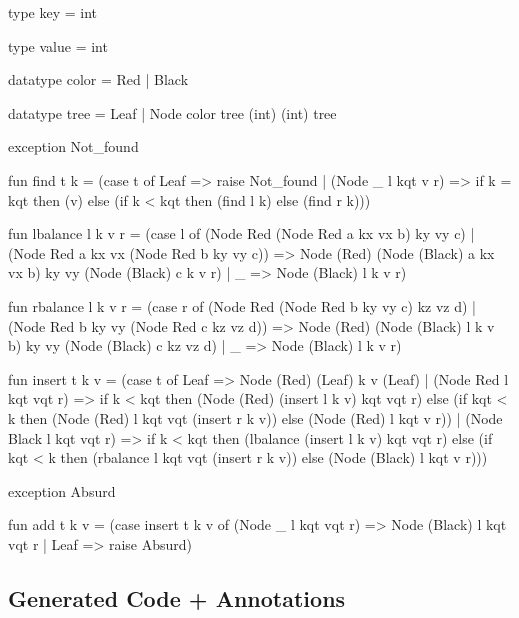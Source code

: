\begin{cakeml}
type key = int

type value = int

datatype color = Red | Black

datatype tree = Leaf | Node color tree (int) (int) tree

exception Not_found



fun find t k =
  (case t of
    Leaf => raise Not_found
  | (Node _ l kqt v r) =>
    if k = kqt then (v)  else (if k < kqt then (find l k)  else (find r k)))

fun lbalance l k v r =
  (case l of
    (Node Red (Node Red a kx vx b) ky vy c) | (Node Red a kx vx (Node Red b
    ky vy c)) =>
    Node (Red) (Node (Black) a kx vx b) ky vy (Node (Black) c k v r)
  | _ => Node (Black) l k v r)

fun rbalance l k v r =
  (case r of
    (Node Red (Node Red b ky vy c) kz vz d) | (Node Red b ky vy (Node Red c
    kz vz d)) =>
    Node (Red) (Node (Black) l k v b) ky vy (Node (Black) c kz vz d)
  | _ => Node (Black) l k v r)

fun insert t k v =
  (case t of
    Leaf => Node (Red) (Leaf) k v (Leaf)
  | (Node Red l kqt vqt r) =>
    if k < kqt then (Node (Red) (insert l k v) kqt vqt r) 
    else (if kqt < k then (Node (Red) l kqt vqt (insert r k v)) 
          else (Node (Red) l kqt v r))
  | (Node Black l kqt vqt r) =>
    if k < kqt then (lbalance (insert l k v) kqt vqt r) 
    else (if kqt < k then (rbalance l kqt vqt (insert r k v)) 
          else (Node (Black) l kqt v r)))

exception Absurd

fun add t k v =
  (case insert t k v of
    (Node _ l kqt vqt r) => Node (Black) l kqt vqt r
  | Leaf => raise Absurd)
\end{cakeml}

\subsection{Generated \cml Code + \gospel Annotations}
\label{subsec:Red_Black_Trees_Cakeml_Gospel}

